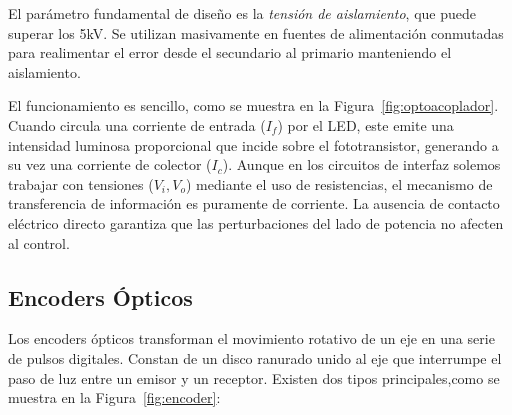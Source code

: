 El parámetro fundamental de diseño es la \emph{tensión de aislamiento}, que puede superar los \unit{5}{kV}. Se utilizan masivamente en fuentes de alimentación conmutadas para realimentar el error desde el secundario al primario manteniendo el aislamiento.

El funcionamiento es sencillo, como se muestra en la Figura~\ref{fig:optoacoplador}. Cuando circula una corriente de entrada ($I_f$) por el LED, este emite una intensidad luminosa proporcional que incide sobre el fototransistor, generando a su vez una corriente de colector ($I_c$). Aunque en los circuitos de interfaz solemos trabajar con tensiones ($V_i, V_o$) mediante el uso de resistencias, el mecanismo de transferencia de información es puramente de corriente. La ausencia de contacto eléctrico directo garantiza que las perturbaciones del lado de potencia no afecten al control.

\subsection{Encoders Ópticos}\label{sub:encoders}

Los encoders ópticos transforman el movimiento rotativo de un eje en una serie de pulsos digitales. Constan de un disco ranurado unido al eje que interrumpe el paso de luz entre un emisor y un receptor. Existen dos tipos principales,como se muestra en la Figura~\ref{fig:encoder}:

        
        
        

